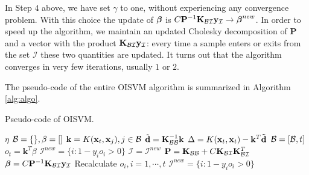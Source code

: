 %
In Step $4$ above, we have set $\gamma$ to one, without experiencing
any convergence problem. With this choice the update of $\boldsymbol{\beta}$ is $C
\mathbf{P}^{-1} \mathbf{K}_{\mathcal{B}\mathcal{I}} \mathbf{y}_{\mathcal{I}} \rightarrow
\boldsymbol{\beta}^{new}$. In order to speed up the algorithm, we maintain an
updated Cholesky decomposition of $\mathbf{P}$ and a vector with the
product $\mathbf{K}_{\mathcal{B}\mathcal{I}} \mathbf{y}_{\mathcal{I}}$: every time a
sample enters or exits from the set $\mathcal{I}$ these two quantities
are updated. It turns out that the algorithm converges in very few
iterations, usually $1$ or $2$.

The pseudo-code of the entire OISVM algorithm is summarized in Algorithm \ref{alg:algo}.

\begin{algorithm}[t]
   \caption{Pseudo-code of OISVM.}
   \label{alg:algo}
\begin{algorithmic}
    $\eta$
    $\mathcal{B}=\{\}, \beta=[]$
   \STATE $\mathbf{k}=K(\mathbf{x}_{t},\mathbf{x}_{j}), j \in \mathcal{B}$
   \STATE $\tilde{\mathbf{d}} = \mathbf{K}_{\mathcal{B}\mathcal{B}}^{-1} \mathbf{k}$
   \STATE $\Delta = K(\mathbf{x}_{t},\mathbf{x}_{t}) - \mathbf{k}^T \tilde{\mathbf{d}}$
   \STATE $\mathcal{B}=[\mathcal{B}, t]$
   \ENDIF
   \STATE $o_{t}=\mathbf{k}^T \beta$
   \STATE $\mathcal{I}^{new} = \{ i: 1-y_i o_i>0 \}$
   \STATE $\mathcal{I} = \mathcal{I}^{new}$
   \STATE $\mathbf{P} = \mathbf{K}_{\mathcal{B}\mathcal{B}} + C \mathbf{K}_{\mathcal{B}\mathcal{I}} \mathbf{K}_{\mathcal{B}\mathcal{I}}^T$
   \STATE $\boldsymbol{\beta}=C\mathbf{P}^{-1} \mathbf{K}_{\mathcal{B}\mathcal{I}} \mathbf{y}_{\mathcal{I}}$
   \STATE Recalculate $o_{i}, i=1,\cdots,t$
   \STATE $\mathcal{I}^{new} = \{ i: 1-y_i o_i>0 \}$
   \ENDIF
   \ENDFOR
\end{algorithmic}
\end{algorithm}

